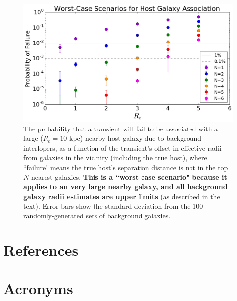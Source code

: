 \documentclass[DM,authoryear,toc]{lsstdoc}
\begin{document}
\begin{figure}[h]
\begin{center}
\includegraphics[width=12cm]{hg_P_vs_Re.png}
\caption{The probability that a transient will fail to be associated with a large ($R_e=10$ kpc) nearby host galaxy due to background interlopers, as a function of the transient's offset in effective radii from galaxies in the vicinity (including the true host), where ``failure" means the true host's separation distance is not in the top $N$ nearest galaxies. \textbf{This is a ``worst case scenario" because it applies to an very large nearby galaxy, and all background galaxy radii estimates are upper limits} (as described in the text). Error bars show the standard deviation from the 100 randomly-generated sets of background galaxies. \label{fig:pfail}}
\end{center}
\end{figure}


\clearpage

\appendix
\section{References} \label{sec:bib}


\section{Acronyms} \label{sec:acronyms}

\end{document}
